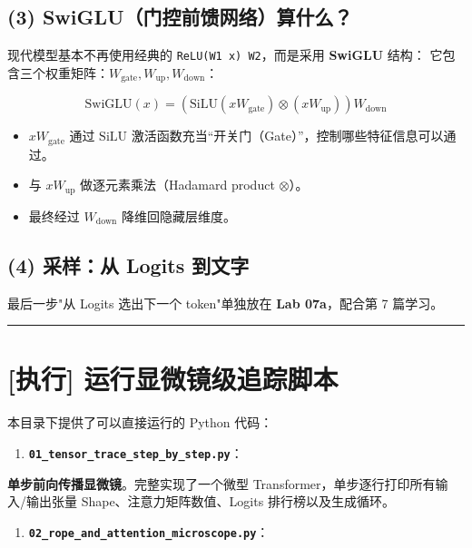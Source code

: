 \subsection{(3) SwiGLU（门控前馈网络）算什么？}

现代模型基本不再使用经典的 \texttt{ReLU(W1 x) W2}，而是采用 \textbf{SwiGLU} 结构：
它包含三个权重矩阵：$W_{\text{gate}}, W_{\text{up}}, W_{\text{down}}$：

\[
\text{SwiGLU}(x) = \left( \text{SiLU}(x W_{\text{gate}}) \otimes (x W_{\text{up}}) \right) W_{\text{down}}
\]

\begin{itemize}
  \item $x W_{\text{gate}}$ 通过 $\text{SiLU}$ 激活函数充当“开关门（Gate）”，控制哪些特征信息可以通过。
  \item 与 $x W_{\text{up}}$ 做逐元素乘法（Hadamard product $\otimes$）。
  \item 最终经过 $W_{\text{down}}$ 降维回隐藏层维度。
\end{itemize}

\subsection{(4) 采样：从 Logits 到文字}

最后一步"从 Logits 选出下一个 token"单独放在 \textbf{Lab 07a}，配合第 7 篇学习。

\vspace{0.8em}\hrule\vspace{0.8em}

\section{[执行] 运行显微镜级追踪脚本}

本目录下提供了可以直接运行的 Python 代码：

\begin{enumerate}
  \item \textbf{\textbf{\texttt{01\_tensor\_trace\_step\_by\_step.py}}}：
\end{enumerate}

   \textbf{单步前向传播显微镜}。完整实现了一个微型 Transformer，单步逐行打印所有输入/输出张量 Shape、注意力矩阵数值、Logits 排行榜以及生成循环。
\begin{enumerate}
  \item \textbf{\textbf{\texttt{02\_rope\_and\_attention\_microscope.py}}}：
\end{enumerate}

